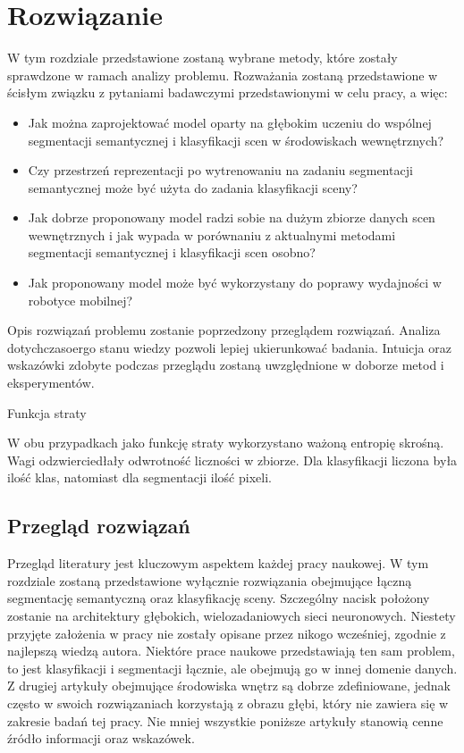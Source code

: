 \newpage %
\section{Rozwiązanie}

W tym rozdziale przedstawione zostaną wybrane metody, które zostały sprawdzone w ramach analizy problemu. Rozważania zostaną przedstawione w ścisłym związku z pytaniami badawczymi przedstawionymi w celu pracy, a więc:

\begin{itemize}
    \item Jak można zaprojektować model oparty na głębokim uczeniu do wspólnej segmentacji semantycznej i klasyfikacji scen w środowiskach wewnętrznych?
    \item Czy przestrzeń reprezentacji po wytrenowaniu na zadaniu segmentacji semantycznej może być użyta do zadania klasyfikacji sceny?
    \item Jak dobrze proponowany model radzi sobie na dużym zbiorze danych scen wewnętrznych i jak wypada w porównaniu z aktualnymi metodami segmentacji semantycznej i klasyfikacji scen osobno?
    \item Jak proponowany model może być wykorzystany do poprawy wydajności w robotyce mobilnej?
\end{itemize}
Opis rozwiązań problemu zostanie poprzedzony przeglądem rozwiązań. Analiza dotychczasoergo stanu wiedzy pozwoli lepiej ukierunkować badania. Intuicja oraz wskazówki zdobyte podczas przeglądu zostaną uwzględnione w doborze metod i eksperymentów.




Funkcja straty

W obu przypadkach jako funkcję straty wykorzystano ważoną entropię skrośną. Wagi odzwierciedłały odwrotność liczności w zbiorze. Dla klasyfikacji liczona była ilość klas, natomiast dla segmentacji ilość pixeli.

\subsection{Przegląd rozwiązań}
Przegląd literatury jest kluczowym aspektem każdej pracy naukowej. W tym rozdziale zostaną przedstawione wyłącznie rozwiązania obejmujące łączną segmentację semantyczną oraz klasyfikację sceny. Szczególny nacisk położony zostanie na architektury głębokich, wielozadaniowych sieci neuronowych. Niestety przyjęte założenia w pracy nie zostały opisane przez nikogo wcześniej, zgodnie z najlepszą wiedzą autora. Niektóre prace naukowe przedstawiają ten sam problem, to jest klasyfikacji i segmentacji łącznie, ale obejmują go w innej domenie danych. Z drugiej artykuły obejmujące środowiska wnętrz są dobrze zdefiniowane, jednak często w swoich rozwiązaniach korzystają z obrazu głębi, który nie zawiera się w zakresie badań tej pracy. Nie mniej wszystkie poniższe artykuły stanowią cenne źródło informacji oraz wskazówek.

